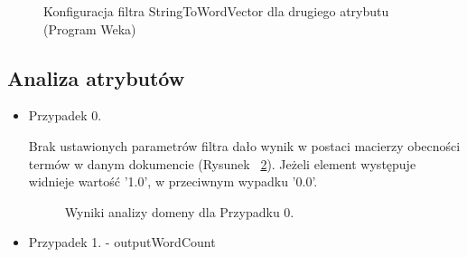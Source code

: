 \documentclass{classrep}
\begin{document}
    \begin{figure}[H] 
    	\begin{center}
        \caption{Konfiguracja filtra StringToWordVector dla drugiego atrybutu (Program Weka)}
        \label{StringToWordVector_conf}
    	\end{center}
    \end{figure}

    \subsection{Analiza atrybutów}
    \renewcommand{\labelitemi}{$\blacksquare$}
    
    \begin{itemize}
    \item  Przypadek 0.
    
    Brak ustawionych parametrów filtra dało wynik w postaci macierzy obecności termów w danym dokumencie (Rysunek ~\ref{FTIMS_3case0_bez_parametrow}). Jeżeli element występuje widnieje wartość '1.0', w przeciwnym wypadku '0.0'.
    \begin{table}[H]
    \centering
    \caption{Parametry zastosowanego filtra StringToWordVector dla przypadku 0.}
    \label{tab:apriori_num_params}
    \end{table}
   
   
    \begin{figure}[H] 
    	\begin{center}
        \caption{Wyniki analizy domeny dla Przypadku 0.}
        \label{FTIMS_3case0_bez_parametrow}
    	\end{center}
    \end{figure}

    \item  Przypadek 1. - outputWordCount
    

\end{itemize}
\end{document}
